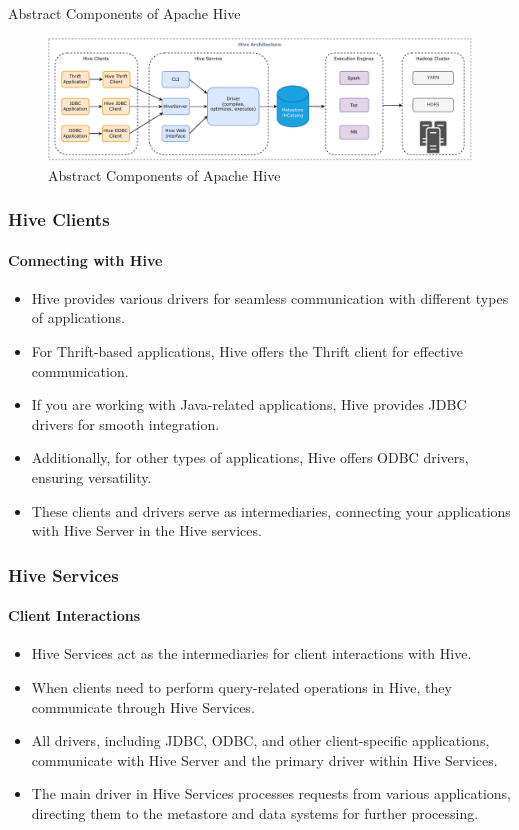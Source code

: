 \begin{frame}{Abstract Components of Apache Hive}
\begin{figure}
\includegraphics[width=\textwidth,height=\textheight,keepaspectratio]{./Figures/chapter-03/Hive_Architecture.pdf}	
\caption{Abstract Components of Apache Hive}
\end{figure}



\end{frame}
\begin{frame}
\frametitle{Hive Clients}
	\framesubtitle{Connecting with Hive}
	
	\begin{itemize}
	  \item Hive provides various drivers for seamless communication with different types of applications.
	  \item For Thrift-based applications, Hive offers the Thrift client for effective communication.
	  \item If you are working with Java-related applications, Hive provides JDBC drivers for smooth integration.
	  \item Additionally, for other types of applications, Hive offers ODBC drivers, ensuring versatility.
	  \item These clients and drivers serve as intermediaries, connecting your applications with Hive Server in the Hive services.
	\end{itemize}
	
	\end{frame}
\begin{frame}
	\frametitle{Hive Services}
	\framesubtitle{Client Interactions}
	
	\begin{itemize}
	  \item Hive Services act as the intermediaries for client interactions with Hive.
	  \item When clients need to perform query-related operations in Hive, they communicate through Hive Services.
	  \item All drivers, including JDBC, ODBC, and other client-specific applications, communicate with Hive Server and the primary driver within Hive Services.
	  \item The main driver in Hive Services processes requests from various applications, directing them to the metastore and data systems for further processing.
	\end{itemize}
	
	\end{frame}
